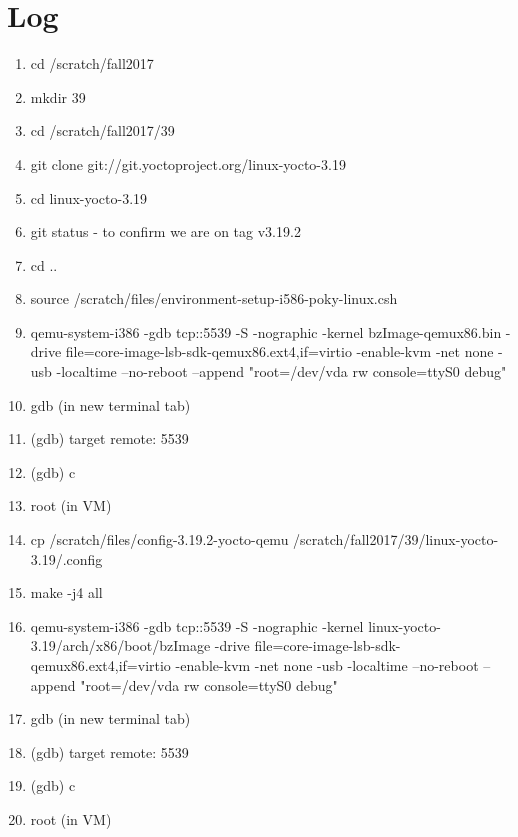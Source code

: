 \documentclass[letterpaper,10pt,draftclsnofoot,onecolumn,titlepage]{IEEEtran}
\begin{document}
\section{Log}
\begin{enumerate}
\item cd /scratch/fall2017
\item mkdir 39
\item cd /scratch/fall2017/39
\item git clone git://git.yoctoproject.org/linux-yocto-3.19
\item cd linux-yocto-3.19
\item git status - to confirm we are on tag v3.19.2
\item cd ..
\item source /scratch/files/environment-setup-i586-poky-linux.csh
\item qemu-system-i386 -gdb tcp::5539 -S -nographic -kernel bzImage-qemux86.bin -drive file=core-image-lsb-sdk-qemux86.ext4,if=virtio -enable-kvm -net none -usb -localtime --no-reboot --append "root=/dev/vda rw console=ttyS0 debug"
\item gdb (in new terminal tab)
\item (gdb) target remote: 5539
\item (gdb) c
\item root (in VM)
\item cp /scratch/files/config-3.19.2-yocto-qemu /scratch/fall2017/39/linux-yocto-3.19/.config
\item make -j4 all
\item qemu-system-i386 -gdb tcp::5539 -S -nographic -kernel linux-yocto-3.19/arch/x86/boot/bzImage -drive file=core-image-lsb-sdk-qemux86.ext4,if=virtio -enable-kvm -net none -usb -localtime --no-reboot --append "root=/dev/vda rw console=ttyS0 debug"
\item gdb (in new terminal tab)
\item (gdb) target remote: 5539
\item (gdb) c
\item root (in VM)


\end{enumerate}
%
\end{document}
